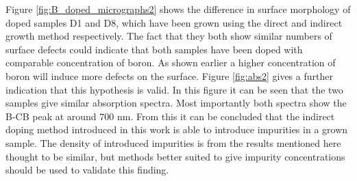 Figure \ref{fig:B_doped_micrographs2} shows the difference in surface morphology of doped samples D1 and D8, which have been grown using the direct and indirect growth method respectively. The fact that they both show similar numbers of surface defects could indicate that both samples have been doped with comparable concentration of boron. As shown earlier a higher concentration of boron will induce more defects on the surface. Figure \ref{fig:abs2} gives a further indication that this hypothesis is valid. In this figure it can be seen that the two samples give similar absorption spectra. Most importantly both spectra show the B-CB peak at around 700 nm. From this it can be concluded that the indirect doping method introduced in this work is able to introduce impurities in a grown sample. The density of introduced impurities is from the results mentioned here thought to be similar, but methods better suited to give impurity concentrations should be used to validate this finding. 


